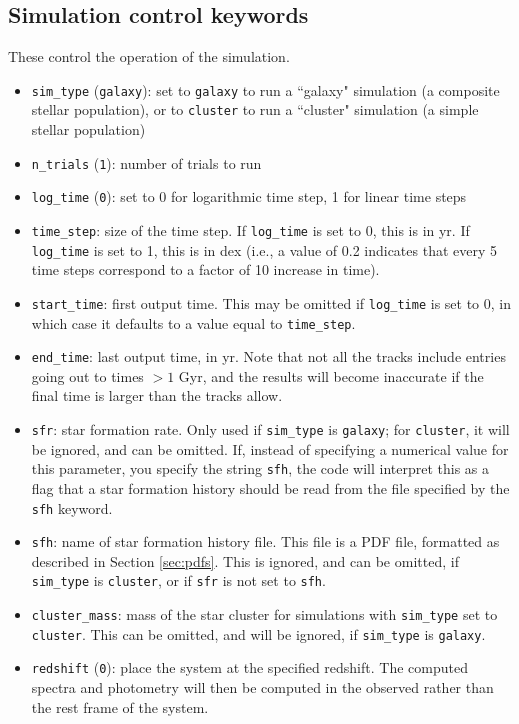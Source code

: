 \documentclass[12pt]{article}
\begin{document}
\subsection{Simulation control keywords}

These control the operation of the simulation.
\begin{itemize}
\item \verb=sim_type= (\verb=galaxy=): set to \verb=galaxy= to run a ``galaxy" simulation (a composite stellar population), or to \verb=cluster= to run a ``cluster" simulation (a simple stellar population)
\item \verb=n_trials= (\verb=1=): number of trials to run
\item \verb=log_time= (\verb=0=): set to 0 for logarithmic time step, 1 for linear time steps
\item \verb=time_step=: size of the time step. If \verb=log_time= is set to 0, this is in yr. If \verb=log_time= is set to 1, this is in dex (i.e., a value of 0.2 indicates that every 5 time steps correspond to a factor of 10 increase in time).
\item \verb=start_time=: first output time. This may be omitted if \verb=log_time= is set to 0, in which case it defaults to a value equal to \verb=time_step=.
\item \verb=end_time=: last output time, in yr. Note that not all the tracks include entries going out to times $>1$ Gyr, and the results will become inaccurate if the final time is larger than the tracks allow.
\item \verb=sfr=: star formation rate. Only used if \verb=sim_type= is \verb=galaxy=; for \verb=cluster=, it will be ignored, and can be omitted. If, instead of specifying a numerical value for this parameter, you specify the string \verb=sfh=, the code will interpret this as a flag that a star formation history should be read from the file specified by the \verb=sfh= keyword.
\item \verb=sfh=: name of star formation history file. This file is a PDF file, formatted as described in Section \ref{sec:pdfs}. This is ignored, and can be omitted, if \verb=sim_type= is \verb=cluster=, or if \verb=sfr= is not set to \verb=sfh=.
\item \verb=cluster_mass=: mass of the star cluster for simulations with \verb=sim_type= set to \verb=cluster=. This can be omitted, and will be ignored, if \verb=sim_type= is \verb=galaxy=.
\item \verb=redshift= (\verb=0=): place the system at the specified redshift. The computed spectra and photometry will then be computed in the observed rather than the rest frame of the system.
\end{itemize}
\end{document}
